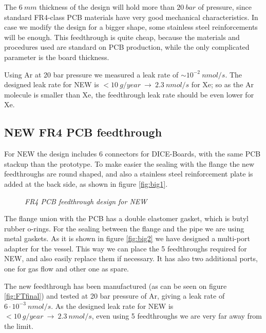 The $6\ mm$ thickness of the design will hold more than $20\ bar$ of pressure, since standard FR4-class PCB materials have very good mechanical characteristics. In case we modify the design for a bigger shape, some stainless steel reinforcements will be enough. This feedthrough is quite cheap, because the materials and procedures used are standard on PCB production, while the only complicated parameter is the board thickness.

Using Ar at 20 bar pressure we measured a leak rate of $\sim10^{-2}~n mol/s$. The designed leak rate for NEW is $<10~g/year\ \longrightarrow\ 2.3~nmol/s$ for Xe; so as the Ar molecule is smaller than Xe, the feedthrough leak rate should be even lower for Xe.

\subsection{NEW FR4 PCB feedthrough}

For NEW the design includes $6$ connectors for DICE-Boards, with the same PCB stackup than the prototype. To make easier the sealing with the flange the new feedthroughs are round shaped, and also a stainless steel reinforcement plate is added at the back side, as shown in figure \ref{fig:big1}.

\begin{figure}[ht]
  \centering
  \hspace{10mm}             
  \caption{\textit{FR4 PCB feedthrough design for NEW}}
\end{figure}

The flange union with the PCB has a double elastomer gasket, which is butyl rubber o-rings. For the sealing between the flange and the pipe we are using metal gaskets. As it is shown in figure \ref{fig:big2} we have designed a multi-port adapter for the vessel. This way we can  place the 5 feedthroughs required for NEW, and also easily replace them if necessary. It has also two additional ports, one for gas flow and other one as spare.

The new feedthrough has been manufactured (as can be seen on figure \ref{fig:FTfinal}) and tested at 20 bar pressure of Ar, giving a leak rate of $6\cdot 10^{-3}~nmol/s$. As the designed leak rate for NEW is $<10~g/year\ \longrightarrow\ 2.3~nmol/s$, even using 5 feedthroughs we are very far away from the limit. 

